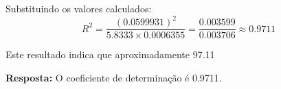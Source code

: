 \documentclass[a4paper,12pt]{article}
\begin{document}
\begin{enumerate}
\begin{mdframed}[backgroundcolor=gray!10,linewidth=0pt,innertopmargin=10pt,innerbottommargin=10pt]
    Substituindo os valores calculados:
    \[
    R^2 = \frac{(0.0599931)^2}{5.8333 \times 0.0006355} = \frac{0.003599}{0.003706} \approx 0.9711
    \]

    Este resultado indica que aproximadamente 97.11%

    \textbf{Resposta:} O coeficiente de determinação é 0.9711.
    \end{mdframed}

\end{enumerate}
\end{document}
